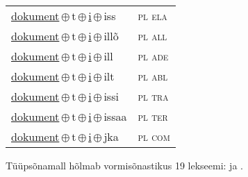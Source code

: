 \begin{minipage}{\textwidth}
\begin{sideways}
\begin{tabular}{l l}
\underline{dokument}\,$\oplus$\,t\,$\oplus$\,\underline{i}\,$\oplus$\,iss & \textsc{ pl ela } \\
\underline{dokument}\,$\oplus$\,t\,$\oplus$\,\underline{i}\,$\oplus$\,illõ & \textsc{ pl all } \\
\underline{dokument}\,$\oplus$\,t\,$\oplus$\,\underline{i}\,$\oplus$\,ill & \textsc{ pl ade } \\
\underline{dokument}\,$\oplus$\,t\,$\oplus$\,\underline{i}\,$\oplus$\,ilt & \textsc{ pl abl } \\
\underline{dokument}\,$\oplus$\,t\,$\oplus$\,\underline{i}\,$\oplus$\,issi & \textsc{ pl tra } \\
\underline{dokument}\,$\oplus$\,t\,$\oplus$\,\underline{i}\,$\oplus$\,issaa & \textsc{ pl ter } \\
\underline{dokument}\,$\oplus$\,t\,$\oplus$\,\underline{i}\,$\oplus$\,jka & \textsc{ pl com } \\
\end{tabular}
\end{sideways}
\label{tab:tüüpsõnamall-dokumentti}

\end{minipage}

 
\vspace{1em}
\noindent Tüüpsõnamall  hõlmab vormisõnastikus 19 lekseemi:  ja .
